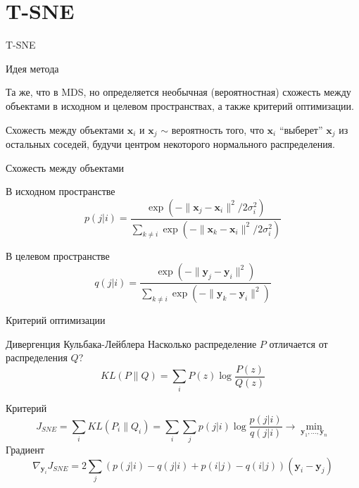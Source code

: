 \documentclass[10pt]{beamer}
\begin{document}

\section{T-SNE}


\begin{frame}

\begin{center}
{\Large T-SNE}
\end{center}

\end{frame}

\begin{frame}{Идея метода}

Та же, что в MDS, но определяется необычная (вероятностная) схожесть между объектами в исходном и целевом пространствах, а также критерий оптимизации.

\vspace{1em}
Схожесть между объектами $\mathbf{x}_i$ и $\mathbf{x}_j$ $\sim$ вероятность того, что $\mathbf{x}_i$ ``выберет'' $\mathbf{x}_j$ из остальных соседей, будучи центром некоторого нормального распределения.

\end{frame}

\begin{frame}{Схожесть между объектами}

В исходном пространстве
\[
p(j | i) = \frac{\exp(-\|\mathbf{x}_j-\mathbf{x}_i\|^2/{2 \sigma_i^2})}{\sum_{k \neq i}\exp(-\|\mathbf{x}_k-\mathbf{x}_i\|^2/{2 \sigma_i^2})}
\]

В целевом пространстве
\[
q(j | i) = \frac{\exp(-\|\mathbf{y}_j-\mathbf{y}_i\|^2)}{\sum_{k \neq i}\exp(-\|\mathbf{y}_k-\mathbf{y}_i\|^2)}
\]

\end{frame}

\begin{frame}{Критерий оптимизации}

\begin{block}{Дивергенция Кульбака-Лейблера}
Насколько распределение $P$ отличается от распределения $Q$?
\[
KL(P \| Q) = \sum_i P(z) \log \frac{P(z)}{Q(z)}
\]
\end{block}

Критерий
\[
J_{SNE} = \sum_i KL(P_i \| Q_i) = \sum_i \sum_j p(j | i) \log \frac{p(j | i)}{q(j | i)} \rightarrow \min_{\mathbf{y}_1, \ldots, \mathbf{y}_n}
\]
Градиент
\[
\nabla_{\mathbf{y}_i} J_{SNE} = 2 \sum_j \left(p(j | i) - q(j | i) + p(i | j) - q(i | j) \right) (\mathbf{y}_i-\mathbf{y}_j)
\]

\end{frame}
\end{document}
